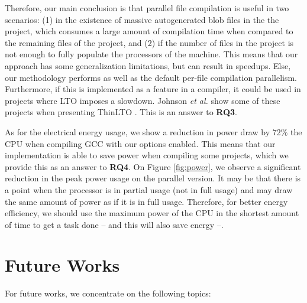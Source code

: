 Therefore, our main conclusion is that parallel file compilation is useful in
two scenarios: (1) in the existence of massive autogenerated blob files in the
the project, which consumes a large amount of compilation time when compared to
the remaining files of the project, and (2) if the number of files in the
project is not enough to fully populate the processors of the machine. This
means that our approach has some generalization limitations, but can result in
speedups. Else, our methodology performs as well as the default per-file
compilation parallelism.  Furthermore, if this is implemented as a feature in a
compiler, it could be used in projects where LTO imposes a slowdown.  Johnson
\textit{et al.} show some of these projects when presenting ThinLTO
\citep{thinlto}. This is an answer to \textbf{RQ3}.

As for the electrical energy usage, we show a reduction in power draw by 72\%
the CPU when compiling GCC with our options enabled. This means that our
implementation is able to save power when compiling some projects, which we
provide this as an answer to \textbf{RQ4}. On Figure \ref{fig:power}, we
observe a significant reduction in the peak power usage on the parallel
version. It may be that there is a point when the processor is in partial usage
(not in full usage) and may draw the same amount of power as if it is in full
usage. Therefore, for better energy efficiency, we should use the maximum power
of the CPU in the shortest amount of time to get a task done -- and this will
also save energy --.

\section{Future Works}

For future works, we concentrate on the following topics:

